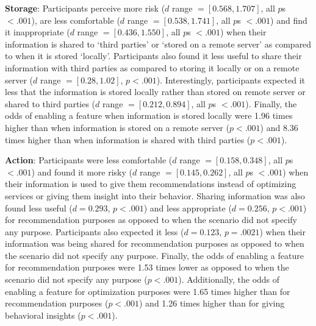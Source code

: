 \textbf{Storage}: Participants perceive more risk ($d$ range $= [0.568, 1.707]$, all $p$s $< .001$), are less comfortable ($d$ range $= [0.538, 1.741]$, all $p$s $< .001$) and find it inappropriate ($d$ range  $=  [0.436, 1.550]$, all $p$s $< .001$) when their information is shared to `third parties' or `stored on a remote server' as compared to when it is stored `locally'. Participants also found it less useful to share their information with third parties as compared to storing it locally or on a remote server ($d$ range $= [0.28, 1.02]$,  $p < .001$). Interestingly, participants expected it less that the information is stored locally rather than stored on remote server or shared to third parties ($d$ range $= [0.212, 0.894]$, all $p$s $< .001$). Finally, the odds of enabling a feature when information is stored locally were 1.96 times higher than when information is stored on a remote server ($p < .001$) and 8.36 times higher than when information is shared with third parties ($p < .001$).

\textbf{Action}: Participants were less comfortable ($d$ range $= [0.158, 0.348]$, all $p$s $< .001$) and found it more risky ($d$ range $= [0.145, 0.262]$, all $p$s $< .001$) when their information is used to give them recommendations instead of optimizing services or giving them insight into their behavior. Sharing information was also found less useful ($d = 0.293$, $p < .001$) and less appropriate ($d = 0.256$, $p < .001$) for recommendation purposes as opposed to when the scenario did not specify any purpose. Participants also expected it less ($d = 0.123$, $p = .0021$) when their information was being shared for recommendation purposes as opposed to when the scenario did not specify any purpose. Finally, the odds of enabling a feature for recommendation purposes were 1.53 times lower as opposed to when the scenario did not specify any purpose ($p < .001$). Additionally, the odds of enabling a feature for optimization purposes were 1.65 times higher than for recommendation purposes ($p < .001$) and 1.26 times higher than for giving behavioral insights ($p < .001$). 


